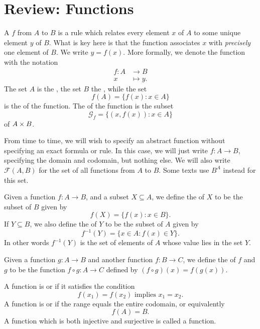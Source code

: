 \section{Review: Functions}

A  $f$ from $A$ to $B$ is a rule which relates every element $x$
of $A$ to some unique element $y$ of $B$.  What is key here is that the
function associates $x$ with \emph{precisely} one element of $B$.  We write $y
= f(x)$.  More formally, we denote the function with the notation
\begin{align*}
  f : A & \to B \\
      x & \mapsto y.
\end{align*}
The set $A$ is the , the set $B$ the , while the
set
\[
  f(A) = \{ f(x) : x \in A \}
\]
is the  of the function.  The  of the function is
the subset
\[
  \mathcal{G}_{f} = \{(x, f(x)) : x \in A \}
\]
of $A \times B$.

From time to time, we will wish to specify an abstract function without
specifying an exact formula or rule.  In this case, we will just write $f: A
\to B$, specifying the domain and codomain, but nothing else.  We will also
write $\mathcal{F}(A,B)$ for the set of all functions from $A$ to
$B$.  Some texts use $B^{A}$ instead for this set.

Given a function $f: A \to B$, and a subset $X \subseteq A$, we define the
 of $X$ to be the subset of $B$ given by
\[
  f(X) = \{f(x) : x \in B\}.
\]
If $Y \subseteq B$, we also define the 
of $Y$ to be the subset of $A$ given by
\[
  f^{-1}(Y) = \{x \in A : f(x) \in Y\}.
\]
In other words $f^{-1}(Y)$ is the set of elements of $A$ whose value lies in
the set $Y$.

Given a function $g: A \to B$ and another function $f: B \to C$, we define
the  of $f$ and $g$ to be
the function $f \circ g : A \to C$ defined by $(f \circ g)(x) = f(g(x))$.

A function is  or  if it satisfies the
condition
\[
  f(x_{1}) = f(x_{2}) \text{ implies } x_{1} = x_{2}.
\]
A function is  or  if the range equals the
entire codomain, or equivalently
\[
  f(A) = B.
\]
A function which is both injective and surjective is called a
 function.

